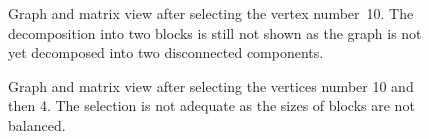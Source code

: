 \documentclass[12pt, oneside]{book}
\begin{document}
\begin{figure}
\centering
{}%
\caption{Graph and matrix view after selecting the vertex number~10. The decomposition into two blocks is still not shown as the graph is not yet decomposed into two disconnected components.}
\label{selected10}
\end{figure}


\begin{figure}
\centering
{}%
\caption{Graph and matrix view after selecting the vertices number 10 and then 4. The selection is not adequate as the sizes of blocks are not balanced.}
\label{selected410}
\end{figure}
\end{document}
